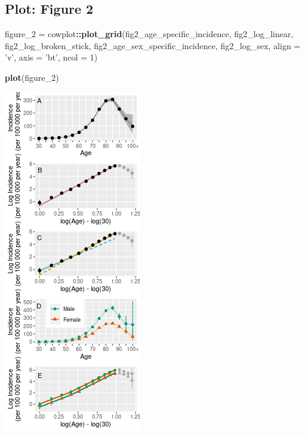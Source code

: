 \documentclass[
]{article}
\newenvironment{Shaded}{\begin{snugshade}}{\end{snugshade}}
\newcommand{\DataTypeTok}[1]{\textcolor[rgb]{0.13,0.29,0.53}{#1}}
\newcommand{\DecValTok}[1]{\textcolor[rgb]{0.00,0.00,0.81}{#1}}
\newcommand{\KeywordTok}[1]{\textcolor[rgb]{0.13,0.29,0.53}{\textbf{#1}}}
\newcommand{\NormalTok}[1]{#1}
\newcommand{\OperatorTok}[1]{\textcolor[rgb]{0.81,0.36,0.00}{\textbf{#1}}}
\newcommand{\StringTok}[1]{\textcolor[rgb]{0.31,0.60,0.02}{#1}}
\begin{document}
\hypertarget{plot-figure-2}{%
\subsection{Plot: Figure 2}\label{plot-figure-2}}

\begin{Shaded}
\begin{Highlighting}[]
\NormalTok{figure_}\DecValTok{2}\NormalTok{ =}\StringTok{ }\NormalTok{cowplot}\OperatorTok{::}\KeywordTok{plot_grid}\NormalTok{(fig2_age_specific_incidence,}
\NormalTok{                              fig2_log_linear,}
\NormalTok{                              fig2_log_broken_stick, }
\NormalTok{                              fig2_age_sex_specific_incidence,}
\NormalTok{                              fig2_log_sex, }
                              \DataTypeTok{align =} \StringTok{'v'}\NormalTok{,}
                              \DataTypeTok{axis =} \StringTok{'bt'}\NormalTok{, }\DataTypeTok{ncol =} \DecValTok{1}\NormalTok{)}

\KeywordTok{plot}\NormalTok{(figure_}\DecValTok{2}\NormalTok{)}
\end{Highlighting}
\end{Shaded}

\includegraphics{multistep-model-comparison_files/figure-latex/figure2-1.png}
\end{document}
